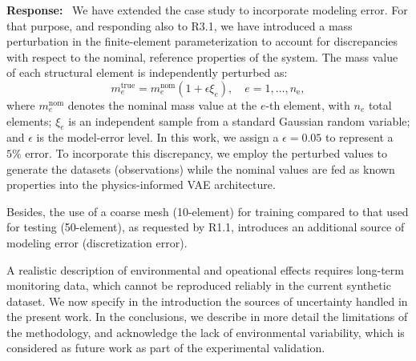 \documentclass[11pt]{article}
\newenvironment{response}{\par\smallskip\noindent\color{resp}\textbf{Response:}\ }{\par}
\begin{document}
\begin{response}
We have extended the case study to incorporate modeling error.
For that purpose, and responding also to R3.1, we have introduced a mass perturbation in the finite-element parameterization to account for discrepancies with respect to the nominal, reference properties of the system. 
The mass value of each structural element is independently perturbed as: 
\begin{equation}
	m_e^{\text{true}} = m_e^{\text{nom}} \left(1 + \epsilon \xi_e\right), \quad e = 1, \dots, n_{\text{e}},
	\label{eq:modeling_error}
\end{equation}
where $m_e^{\text{nom}}$ denotes the nominal mass value at the $e$-th element, with $n_{e}$ total elements; $\xi_e$ is an independent sample from a standard Gaussian random variable; and $\epsilon$ is the model-error level. 
In this work, we assign a $\epsilon = 0.05$ to represent a $5\%$ error. 
To incorporate this discrepancy, we employ the perturbed values to generate the datasets (observations) while the nominal values are fed as known properties into the physics-informed VAE architecture. 

Besides, the use of a coarse mesh (10-element) for training compared to that used for testing (50-element), as requested by R1.1, introduces an additional source of modeling error (discretization error).

A realistic description of environmental and opeational effects requires long-term monitoring data, which cannot be reproduced reliably in the current synthetic dataset. 
We now specify in the introduction the sources of uncertainty handled in the present work. 
In the conclusions, we describe in more detail the limitations of the methodology, and acknowledge the lack of environmental variability, which is considered as future work as part of the experimental validation. 



\end{response}
\end{document}
